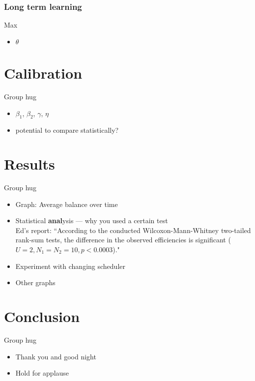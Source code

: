 \documentclass{acm_proc_article-sp}
\begin{document}
\subsubsection{Long term learning} \label{sec:AA_long_term_learning}
Max
\begin{itemize} \itemsep0pt
	\item $\theta$
\end{itemize}



\section{Calibration} \label{sec:calibration}
Group hug
\begin{itemize} \itemsep0pt
	\item $\beta_1$, $\beta_2$, $\gamma$, $\eta$
	\item potential to compare statistically?
\end{itemize}


\section{Results} \label{sec:results}
Group hug
\begin{itemize} \itemsep0pt
	\item Graph: Average balance over time
	\item Statistical \textbf{anal}ysis --- why you used a certain test\\
Ed's report: ``According to the conducted Wilcoxon-Mann-Whitney two-tailed rank-sum tests, the difference in the observed efficiencies is significant ($U = 2, N_1 = N_2 = 10, p < 0.0003$)."
	\item Experiment with changing scheduler
	\item Other graphs
\end{itemize}

\section{Conclusion} \label{sec:conclusion}
Group hug
\begin{itemize} \itemsep0pt
	\item Thank you and good night
	\item Hold for applause
\end{itemize}




\end{document}
